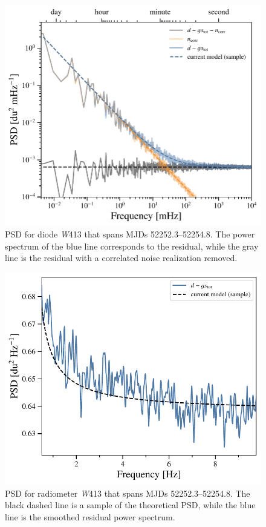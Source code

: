 \documentclass[twocolumn]{../../common/aa}
\newcommand{\W}[0]{\textit W}
\begin{document}
\begin{figure}
	\includegraphics[width=\columnwidth]{figures/ps_test_W4_det1.pdf}
	\caption{PSD for diode \W413 that spans MJDs 52252.3--52254.8. The power spectrum of the blue line corresponds to the residual, while the gray line is the residual with a correlated noise realization removed.}
	\label{fig:W413_psd}
\end{figure}

\begin{figure}
	\includegraphics[width=\columnwidth]{figures/ps_test_W4_det1_zoom.pdf}
	\caption{PSD for radiometer \W413 that spans MJDs 52252.3--52254.8. 
	The black dashed line is a sample of the theoretical PSD, while the blue line is the smoothed residual power spectrum.
	}
	\label{fig:W413_psd_zoom}
\end{figure}
\end{document}
